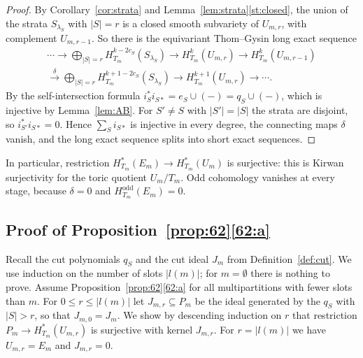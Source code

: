 \documentclass[11pt]{amsart}
\theoremstyle{definition}
\theoremstyle{remark}
\numberwithin{equation}{section}
\begin{document}
\begin{proof}
By Corollary~\ref{cor:strata} and Lemma~\ref{lem:strata}\ref{st:closed}, the union of the strata
$S_{\lambda_S}$ with $|S|=r$ is a closed smooth subvariety of $U_{m,r}$, with complement $U_{m,r-1}$. So
there is the equivariant Thom--Gysin long exact sequence
\begin{multline*}
  \cdots\to\bigoplus_{|S|=r}H^{k-2c_S}_{T_m}(S_{\lambda_S})\to H^k_{T_m}(U_{m,r})\to
  H^k_{T_m}(U_{m,r-1})\\
  \xrightarrow{\ \delta\ }\bigoplus_{|S|=r}H^{k+1-2c_S}_{T_m}(S_{\lambda_S})\to H^{k+1}_{T_m}(U_{m,r})
  \to\cdots .
\end{multline*}
By the self-intersection formula $i_S^*i_{S*}=e_S\cup(-)=q_S\cup(-)$, which is injective by
Lemma~\ref{lem:AB}. For $S'\neq S$ with $|S'|=|S|$ the strata are disjoint, so $i_{S'}^*i_{S*}=0$. Hence
$\sum_Si_{S*}$ is injective in every degree, the connecting maps $\delta$ vanish, and the long exact
sequence splits into short exact sequences.
\end{proof}

In particular, restriction $H^*_{T_m}(E_m)\to H^*_{T_m}(U_m)$ is surjective: this is Kirwan surjectivity
for the toric quotient $U_m/T_m$. Odd cohomology vanishes at every stage, because $\delta=0$ and
$H^{\mathrm{odd}}_{T_m}(E_m)=0$.

\subsection{Proof of Proposition~\ref{prop:62}\ref{62:a}}\label{subsec:proofa}
Recall the cut polynomials $q_S$ and the cut ideal $J_m$ from Definition~\ref{def:cut}. We use induction
on the number of slots $|l(m)|$; for $m=\emptyset$ there is nothing to prove. Assume
Proposition~\ref{prop:62}\ref{62:a} for all multipartitions with fewer slots than $m$. For
$0\le r\le|l(m)|$ let $J_{m,r}\subseteq P_m$ be the ideal generated by the $q_S$ with $|S|>r$, so that
$J_{m,0}=J_m$. We show by descending induction on $r$ that restriction $P_m\to H^*_{T_m}(U_{m,r})$ is
surjective with kernel $J_{m,r}$. For $r=|l(m)|$ we have $U_{m,r}=E_m$ and $J_{m,r}=0$.
\end{document}
